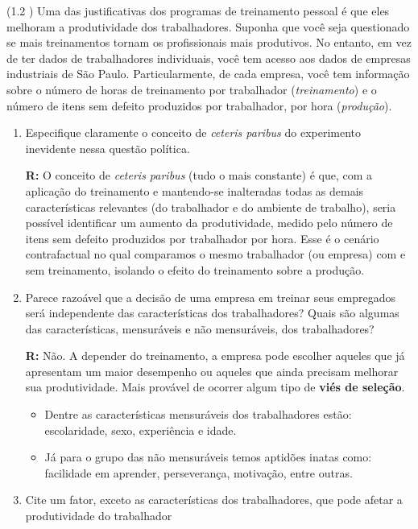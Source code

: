 \documentclass[12pt,letterpaper, onecolumn]{exam}
\renewenvironment{solution}
  {\par\noindent\textbf{R:}\enspace\color{blue}}
  {\par\color{black}}
\begin{document}
\begin{questions}
    \question (1.2 \citep{wooldridge2016}) Uma das justificativas dos programas de treinamento pessoal é que eles melhoram a produtividade dos trabalhadores. Suponha que você seja questionado se mais treinamentos tornam os profissionais mais produtivos. No entanto, em vez de ter dados de trabalhadores individuais, você tem acesso aos dados de empresas industriais de São Paulo. Particularmente, de cada empresa, você tem informação sobre o número de horas de treinamento por trabalhador (\textit{treinamento}) e o número de itens sem defeito produzidos por trabalhador, por hora (\textit{produção}).
    \begin{enumerate}[label=(\alph*)]
    \item Especifique claramente o conceito de \textit{ceteris paribus} do experimento inevidente nessa questão política.
    \begin{solution}
        O conceito de \textit{ceteris paribus} (tudo o mais constante) é que, com a aplicação do treinamento e mantendo-se inalteradas todas as demais características relevantes (do trabalhador e do ambiente de trabalho), seria possível identificar um aumento da produtividade, medido pelo número de itens sem defeito produzidos por trabalhador por hora. Esse é o cenário contrafactual no qual comparamos o mesmo trabalhador (ou empresa) com e sem treinamento, isolando o efeito do treinamento sobre a produção.
    \end{solution}
    \item Parece razoável que a decisão de uma empresa em treinar seus empregados será independente das características dos trabalhadores? Quais são algumas das características, mensuráveis e não mensuráveis, dos trabalhadores?
    \begin{solution}
        Não. A depender do treinamento, a empresa pode escolher aqueles que já apresentam um maior desempenho ou aqueles que ainda precisam melhorar sua produtividade. Mais provável de ocorrer algum tipo de \textbf{viés de seleção}.
        \begin{itemize}
            \item Dentre as características mensuráveis dos trabalhadores estão: escolaridade, sexo, experiência e idade.
            \item Já para o grupo das não mensuráveis temos aptidões inatas como: facilidade em aprender, perseverança, motivação, entre outras.
        \end{itemize}
    \end{solution}
    \item Cite um fator, exceto as características dos trabalhadores, que pode afetar a produtividade do trabalhador

\end{enumerate}
\end{questions}
\end{document}
